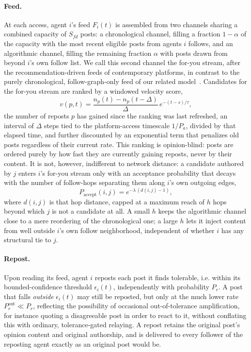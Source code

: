 \documentclass{svproc}
\begin{document}
\paragraph{Feed.} At each access, agent $i$'s feed $F_i(t)$ is assembled from two channels sharing a combined capacity of $S_{fd}$ posts: a chronological channel, filling a fraction $1-\alpha$ of the capacity with the most recent eligible posts from agents $i$ follows, and an algorithmic channel, filling the remaining fraction $\alpha$ with posts drawn from beyond $i$'s own follow list. We call this second channel the for-you stream, after the recommendation-driven feeds of contemporary platforms, in contrast to the purely chronological, follow-graph-only feed of our related model~\cite{takeda2026backfire}. Candidates for the for-you stream are ranked by a windowed velocity score,
\begin{equation}
v(p,t) = \frac{n_p(t)-n_p(t-\Delta)}{\Delta}\,e^{-(t-s)/\tau},
\end{equation}
the number of reposts $p$ has gained since the ranking was last refreshed, an interval of $\Delta$ steps tied to the platform-access timescale $1/P_a$, divided by that elapsed time, and further discounted by an exponential term that penalizes old posts regardless of their current rate. This ranking is opinion-blind: posts are ordered purely by how fast they are currently gaining reposts, never by their content. It is not, however, indifferent to network distance: a candidate authored by $j$ enters $i$'s for-you stream only with an acceptance probability that decays with the number of follow-hops separating them along $i$'s own outgoing edges,
\begin{equation}
P_{\mathrm{accept}}(i,j) = e^{-\lambda\,(d(i,j)-1)},
\end{equation}
where $d(i,j)$ is that hop distance, capped at a maximum reach of $h$ hops beyond which $j$ is not a candidate at all. A small $h$ keeps the algorithmic channel close to a mere reordering of the chronological one; a large $h$ lets it inject content from well outside $i$'s own follow neighborhood, independent of whether $i$ has any structural tie to $j$.

\paragraph{Repost.} Upon reading its feed, agent $i$ reposts each post it finds tolerable, i.e. within its bounded-confidence threshold $\epsilon_i(t)$, independently with probability $P_r$. A post that falls \emph{outside} $\epsilon_i(t)$ may still be reposted, but only at the much lower rate $P_r^{\mathrm{out}}\ll P_r$, reflecting the possibility of occasional out-of-tolerance amplification, for instance quoting a disagreeable post in order to react to it, without conflating this with ordinary, tolerance-gated relaying. A repost retains the original post's opinion content and original authorship, and is delivered to every follower of the reposting agent exactly as an original post would be.
\end{document}
